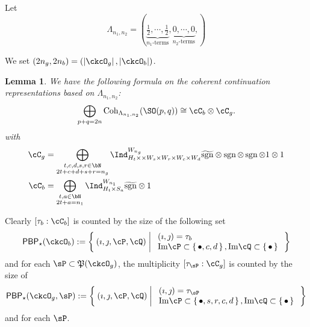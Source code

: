 \documentclass[12pt,a4paper]{amsart}
\def\Im{\operatorname{Im}}
\def\abs#1{\left|{#1}\right|}
\newcommand{\sgn}{\operatorname{sgn}}
\numberwithin{equation}{section}
\newtheorem{lem}[thm]{Lemma}
\theoremstyle{remark}
\def\half{{\tfrac{1}{2}}}
\def\Cint#1{\Coh_{[#1]}}
\def\Im{\mathrm{Im}}
\def\Coh{\mathrm{Coh}}
\def\CPP{\mathfrak{P}}
\def\hsgn{\widetilde{\mathrm{sgn}}}
\begin{document}
Let \[
  \Lambda_{n_{1}, n_{2}} = (\underbrace{\half,\cdots,\half}_{n_{1}\text{-terms}}, \underbrace{0,\cdots,0}_{n_{2}\text{-terms}}, )
\]

We set $(2n_{g},2n_{b}) = (\abs{\ckcO_g},\abs{\ckcO_b})$.

\begin{lem}
  We have the following formula on the coherent continuation
  representations based on $\Lambda_{n_{1},n_{2}}$:
  \[
    \bigoplus_{p+q=2n} \Coh_{\Lambda_{n_1, n_2}}(\SO(p,q)) \cong \cC_{b}\otimes \cC_{g}.
  \]
  with
  \[
    \begin{split}
      \cC_g %
      &=\bigoplus_{\substack{t,c,d,s,r\in\bN\\2t+c+d+s+r=n_{g}}} \Ind_{H_{t} \times \times W_s\times W_r\times W_{c}\times W_{d} }^{W_{n_{g}}}
      \hsgn \otimes \sgn \otimes \sgn \otimes 1\otimes 1\\
      \cC_b & =
      \bigoplus_{\substack{t,a\in \bN\\2t+a=n_{1}}}
      \Ind_{H_{t}\times S_{a}}^{W_{n_{1}}} \hsgn\otimes 1
    \end{split}
  \]
\end{lem}


Clearly $[\tau_{b}:\cC_{b}]$ is counted by the size of the following set
\[
  \PBP_{\star}(\ckcO_b) := \Set{(\imath,\jmath,\cP,\cQ)| %
    \begin{array}{l}
      (\imath,\jmath) = \tau_{b}\\
      \Im \cP \subset \set{\bullet,c,d}, \Im \cQ \subset\set{\bullet}\\
    \end{array}
  }
\]
and for each $\sP\subset \CPP(\ckcO_{g})$, the multiplicity
$[\tau_{\sP}: \cC_{g}]$ is counted by the size of
\[
  \PBP_{\star}(\ckcO_g,\sP):= \Set{(\imath,\jmath,\cP,\cQ)| %
    \begin{array}{l}
      (\imath,\jmath) = \tau_{\sP}\\
      \Im \cP \subset \set{\bullet,s,r,c,d}, \Im \cQ \subset\set{\bullet}\\
    \end{array}
  }
\]
and for each $\sP$.
\end{document}
